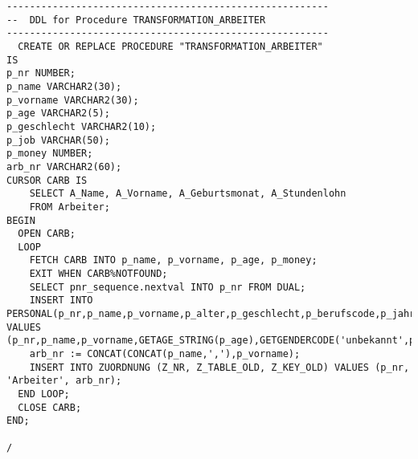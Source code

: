 \documentclass{scrartcl}
\begin{document}
\begin{lstlisting}
--------------------------------------------------------
--  DDL for Procedure TRANSFORMATION_ARBEITER
--------------------------------------------------------
  CREATE OR REPLACE PROCEDURE "TRANSFORMATION_ARBEITER" 
IS
p_nr NUMBER;
p_name VARCHAR2(30);
p_vorname VARCHAR2(30);
p_age VARCHAR2(5);
p_geschlecht VARCHAR2(10);
p_job VARCHAR(50);
p_money NUMBER;
arb_nr VARCHAR2(60);
CURSOR CARB IS
	SELECT A_Name, A_Vorname, A_Geburtsmonat, A_Stundenlohn
	FROM Arbeiter;
BEGIN
  OPEN CARB;
  LOOP 
	FETCH CARB INTO p_name, p_vorname, p_age, p_money;
	EXIT WHEN CARB%NOTFOUND;
	SELECT pnr_sequence.nextval INTO p_nr FROM DUAL;
 	INSERT INTO PERSONAL(p_nr,p_name,p_vorname,p_alter,p_geschlecht,p_berufscode,p_jahreseinkommen) VALUES (p_nr,p_name,p_vorname,GETAGE_STRING(p_age),GETGENDERCODE('unbekannt',p_vorname),GETJOBCODE('Arbeiter'),GETMONEY(p_money*4*40));
	arb_nr := CONCAT(CONCAT(p_name,','),p_vorname);
	INSERT INTO ZUORDNUNG (Z_NR, Z_TABLE_OLD, Z_KEY_OLD) VALUES (p_nr, 'Arbeiter', arb_nr);
  END LOOP; 
  CLOSE CARB;
END;

/
\end{lstlisting}
\end{document}
